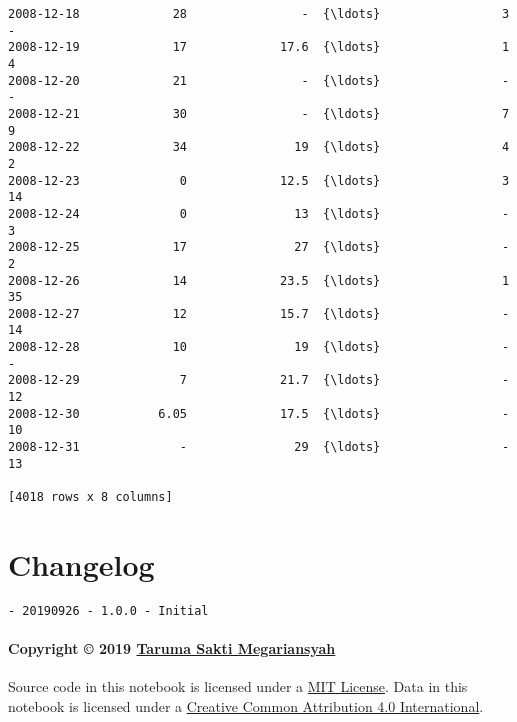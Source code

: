 \documentclass[11pt]{article}
\begin{document}
\begin{tcolorbox}[breakable, size=fbox, boxrule=.5pt, pad at break*=1mm, opacityfill=0]
\begin{Verbatim}[commandchars=\\\{\}]
2008-12-18             28                -  {\ldots}                 3              -
2008-12-19             17             17.6  {\ldots}                 1              4
2008-12-20             21                -  {\ldots}                 -              -
2008-12-21             30                -  {\ldots}                 7              9
2008-12-22             34               19  {\ldots}                 4              2
2008-12-23              0             12.5  {\ldots}                 3             14
2008-12-24              0               13  {\ldots}                 -              3
2008-12-25             17               27  {\ldots}                 -              2
2008-12-26             14             23.5  {\ldots}                 1             35
2008-12-27             12             15.7  {\ldots}                 -             14
2008-12-28             10               19  {\ldots}                 -              -
2008-12-29              7             21.7  {\ldots}                 -             12
2008-12-30           6.05             17.5  {\ldots}                 -             10
2008-12-31              -               29  {\ldots}                 -             13

[4018 rows x 8 columns]
\end{Verbatim}
\end{tcolorbox}
        
    \hypertarget{changelog}{%
\section{Changelog}\label{changelog}}

\begin{verbatim}
- 20190926 - 1.0.0 - Initial
\end{verbatim}

\hypertarget{copyright-2019-taruma-sakti-megariansyah}{%
\paragraph{\texorpdfstring{Copyright © 2019
\href{https://taruma.github.io}{Taruma Sakti
Megariansyah}}{Copyright © 2019 Taruma Sakti Megariansyah}}\label{copyright-2019-taruma-sakti-megariansyah}}

Source code in this notebook is licensed under a
\href{https://choosealicense.com/licenses/mit/}{MIT License}. Data in
this notebook is licensed under a
\href{https://creativecommons.org/licenses/by/4.0/}{Creative Common
Attribution 4.0 International}.


    
    
    
\end{document}
